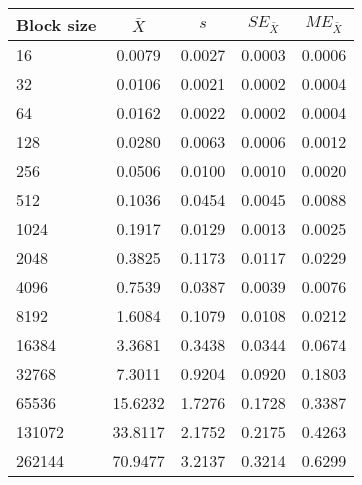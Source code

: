 \begin{tabular}{lcccc}\toprule
{\small Block size} & $\bar{X}$ & $s$ & $SE_{\bar{X}}$ & $ME_{\bar{X}}$ \\\midrule
16 & 0.0079 & 0.0027 & 0.0003 & 0.0006\\
32 & 0.0106 & 0.0021 & 0.0002 & 0.0004\\
64 & 0.0162 & 0.0022 & 0.0002 & 0.0004\\
128 & 0.0280 & 0.0063 & 0.0006 & 0.0012\\
256 & 0.0506 & 0.0100 & 0.0010 & 0.0020\\
512 & 0.1036 & 0.0454 & 0.0045 & 0.0088\\
1024 & 0.1917 & 0.0129 & 0.0013 & 0.0025\\
2048 & 0.3825 & 0.1173 & 0.0117 & 0.0229\\
4096 & 0.7539 & 0.0387 & 0.0039 & 0.0076\\
8192 & 1.6084 & 0.1079 & 0.0108 & 0.0212\\
16384 & 3.3681 & 0.3438 & 0.0344 & 0.0674\\
32768 & 7.3011 & 0.9204 & 0.0920 & 0.1803\\
65536 & 15.6232 & 1.7276 & 0.1728 & 0.3387\\
131072 & 33.8117 & 2.1752 & 0.2175 & 0.4263\\
262144 & 70.9477 & 3.2137 & 0.3214 & 0.6299\\
\bottomrule
\end{tabular}
